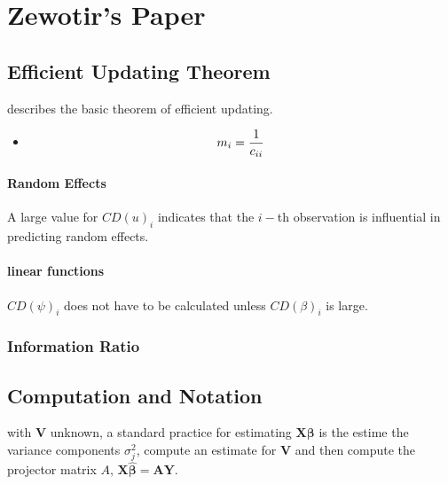 \documentclass[12pt, a4paper]{article}
\begin{document}
\newpage
\chapter{Zewotir's Paper}




\section{Efficient Updating Theorem} %
\citet{Zewotir} describes the basic theorem of efficient updating.
\begin{itemize}
	\item \[ m_i = {1 \over c_{ii}}\]
\end{itemize}



\newpage
\subsubsection{Random Effects}


A large value for $CD(u)_i$ indicates that the $i-$th observation is influential in predicting random effects.


\subsubsection{linear functions}


$CD(\psi)_i$ does not have to be calculated unless $CD(\beta)_i$ is large.




\subsection{Information Ratio}




\newpage
\section{Computation and Notation } %
with $\boldsymbol{V}$ unknown, a standard practice for estimating $\boldsymbol{X \beta}$ is the estime the variance components $\sigma^2_j$,
compute an estimate for $\boldsymbol{V}$ and then compute the projector matrix $A$, $\boldsymbol{X \hat{\beta}}  = \boldsymbol{AY}$.
\end{document}
